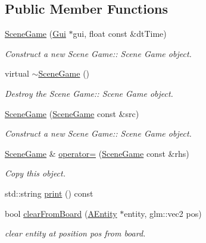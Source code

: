 \subsection*{Public Member Functions}
\begin{DoxyCompactItemize}
\item 
\hyperlink{class_scene_game_a1657843625d6983e5eb49e7509f88108}{Scene\+Game} (\hyperlink{class_gui}{Gui} $\ast$gui, float const \&dt\+Time)
\begin{DoxyCompactList}\small\item\em Construct a new Scene Game\+:\+: Scene Game object. \end{DoxyCompactList}\item 
\mbox{\label{class_scene_game_ae2813101b38f595f7ce11083cb23749b}} 
virtual \hyperlink{class_scene_game_ae2813101b38f595f7ce11083cb23749b}{$\sim$\+Scene\+Game} ()
\begin{DoxyCompactList}\small\item\em Destroy the Scene Game\+:\+: Scene Game object. \end{DoxyCompactList}\item 
\hyperlink{class_scene_game_a0fcd21aad79ec54227df066acd260386}{Scene\+Game} (\hyperlink{class_scene_game}{Scene\+Game} const \&src)
\begin{DoxyCompactList}\small\item\em Construct a new Scene Game\+:\+: Scene Game object. \end{DoxyCompactList}\item 
\hyperlink{class_scene_game}{Scene\+Game} \& \hyperlink{class_scene_game_a43a31ea04e25cc4ca0f2bf7e0b082c66}{operator=} (\hyperlink{class_scene_game}{Scene\+Game} const \&rhs)
\begin{DoxyCompactList}\small\item\em Copy this object. \end{DoxyCompactList}\item 
std\+::string \hyperlink{class_scene_game_ade3372481910abd46f43c214ec3b2a27}{print} () const
\item 
bool \hyperlink{class_scene_game_a50787dc8e9c4fd8df0c5bd918e48f3f5}{clear\+From\+Board} (\hyperlink{class_a_entity}{A\+Entity} $\ast$entity, glm\+::vec2 pos)
\begin{DoxyCompactList}\small\item\em clear entity at position pos from board. \end{DoxyCompactList}\item 

\end{DoxyCompactItemize}
